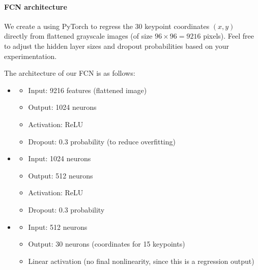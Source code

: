\documentclass[letterpaper,10pt,english]{jupyterBook}
\begin{document}
\paragraph{FCN architecture}
\label{\detokenize{04:fcn-architecture}}
\sphinxAtStartPar
We create a  using PyTorch to regress the 30 keypoint coordinates \((x, y)\) directly from flattened grayscale images (of size \(96 \times 96 = 9216\) pixels). Feel free to adjust the hidden layer sizes and dropout probabilities based on your experimentation.

\sphinxAtStartPar
The architecture of our FCN is as follows:
\begin{itemize}
\item {} 
\sphinxAtStartPar
{}
\begin{itemize}
\item {} 
\sphinxAtStartPar
Input: 9216 features (flattened image)

\item {} 
\sphinxAtStartPar
Output: 1024 neurons

\item {} 
\sphinxAtStartPar
Activation: ReLU

\item {} 
\sphinxAtStartPar
Dropout: 0.3 probability (to reduce overfitting)

\end{itemize}

\item {} 
\sphinxAtStartPar
{}
\begin{itemize}
\item {} 
\sphinxAtStartPar
Input: 1024 neurons

\item {} 
\sphinxAtStartPar
Output: 512 neurons

\item {} 
\sphinxAtStartPar
Activation: ReLU

\item {} 
\sphinxAtStartPar
Dropout: 0.3 probability

\end{itemize}

\item {} 
\sphinxAtStartPar
{}
\begin{itemize}
\item {} 
\sphinxAtStartPar
Input: 512 neurons

\item {} 
\sphinxAtStartPar
Output: 30 neurons (coordinates for 15 keypoints)

\item {} 
\sphinxAtStartPar
Linear activation (no final nonlinearity, since this is a regression output)

\end{itemize}

\end{itemize}
\end{document}
